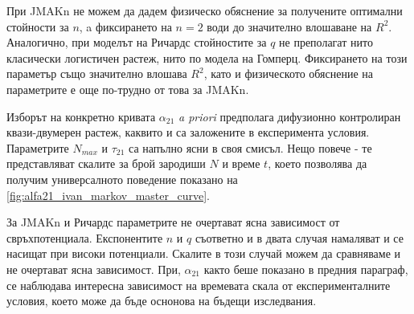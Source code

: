 При JMAKn не можем да дадем физическо обяснение за получените оптимални стойности за $n$, a фиксирането на $n = 2$ води до значително влошаване на $R^2$. Аналогично, при моделът на Ричардс стойностите за $q$ не преполагат нито класически логистичен растеж, нито по модела на Гомперц. Фиксирането на този параметър също значително влошава $R^2$, като и физическото обяснение на параметрите е още по-трудно от това за JMAKn.

Изборът на конкретно кривата $\alpha_{21}$ \textit{a priori} предполага дифузионно контролиран квази-двумерен растеж, каквито и са заложените в експеримента условия. Параметрите $N_{max}$ и $\tau_{21}$ са напълно ясни в своя смисъл. Нещо повече - те представляват скалите за брой зародиши $N$ и време $t$, което позволява да получим универсалното поведение показано на \autoref{fig:alfa21_ivan_markov_master_curve}. 

За JMAKn и Ричардс параметрите не очертават ясна зависимост от свръхпотенциала. Експонентите $n$ и $q$ съответно и в двата случая намаляват и се насищат при високи потенциали. Скалите в този случай можем да сравняваме и не очертават ясна зависимост. При, $\alpha_{21}$ както беше показано в предния параграф, се наблюдава интересна зависимост на времевата скала от експерименталните условия, което може да бъде оснонова на бъдещи изследвания.